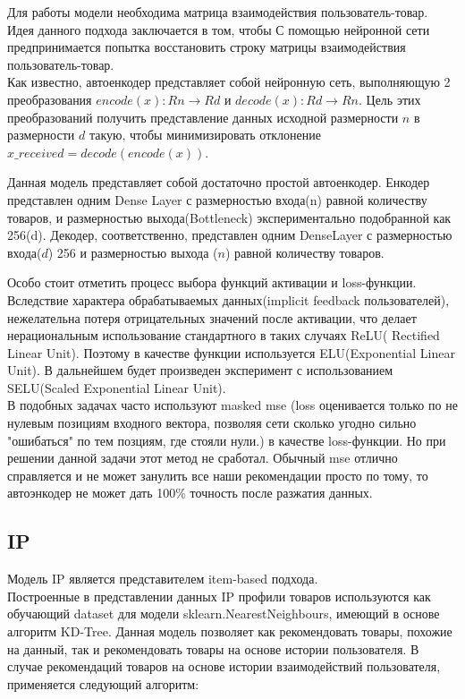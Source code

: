 \documentclass[14pt]{mmcs_article}
\begin{document}
Для работы модели необходима матрица взаимодействия пользователь-товар. Идея данного подхода заключается в том, чтобы С помощью нейронной сети предпринимается попытка восстановить строку матрицы взаимодействия пользователь-товар.\cite{AEA1} \\

Как известно, автоенкодер представляет собой нейронную сеть, выполняющую 2 преобразования  $encode(x) : Rn \rightarrow Rd$ и $decode(x) : Rd \rightarrow Rn$. Цель этих преобразований получить представление данных исходной размерности $n$ в размерности $d$ такую, чтобы минимизировать отклонение $x\_received =decode(encode(x))$.

Данная модель представляет собой достаточно простой автоенкодер. Енкодер представлен одним Dense Layer с размерностью входа(n) равной количеству товаров, и размерностью выхода(Bottleneck) экспериментально подобранной как 256(d). Декодер, соответственно, представлен одним DenseLayer с размерностью входа($d$) 256 и размерностью выхода ($n$) равной количеству товаров. 

Особо стоит отметить процесс выбора функций активации и loss-функции. Вследствие характера обрабатываемых данных(implicit feedback пользователей), нежелательна потеря отрицательных значений после активации, что делает нерациональным использование стандартного в таких случаях ReLU( Rectified Linear Unit). Поэтому в качестве функции используется ELU(Exponential Linear Unit). В дальнейшем будет произведен эксперимент с использованием SELU(Scaled Exponential Linear Unit).\\

В подобных задачах часто используют masked mse (loss оценивается только по не нулевым позициям входного вектора, позволяя сети сколько угодно сильно "ошибаться" по тем позциям, где стояли нули.) в качестве loss-функции.  Но при решении данной задачи этот метод не сработал. Обычный mse отлично справляется и не может занулить все наши рекомендации просто по тому, то автоэнкодер не может дать 100\% точность после разжатия данных.


\subsection{IP}
Модель IP является представителем item-based подхода. \\
Построенные в представлении данных IP профили товаров используются как обучающий dataset для модели sklearn.NearestNeighbours, имеющий в основе алгоритм KD-Tree. Данная модель позволяет как рекомендовать товары, похожие на данный, так и рекомендовать товары на основе истории пользователя.  
В случае рекомендаций товаров на основе истории взаимодействий пользователя, применяется следующий алгоритм:
\end{document}
